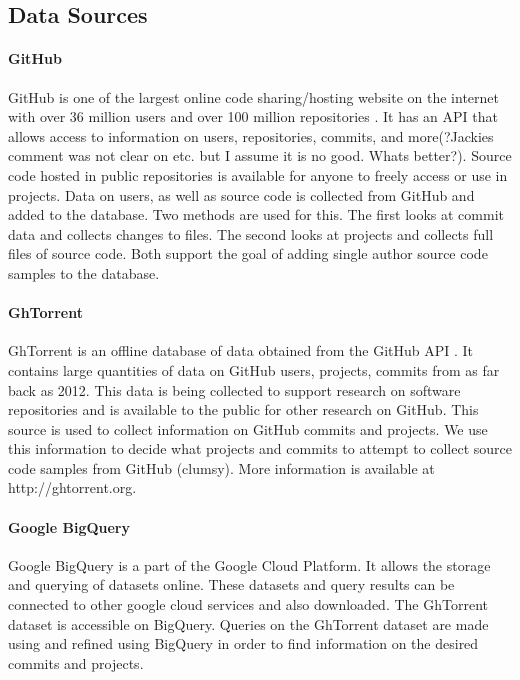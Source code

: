 \documentclass{article}
\begin{document}
\subsection{Data Sources}
\paragraph{GitHub}
GitHub is one of the largest online code sharing/hosting website on the internet with over 36 million users and over 100 million repositories \cite{WEBSITE:Git1}. It has an API that allows access to information on users, repositories, commits, and more(?Jackies comment was not clear on etc. but I assume it is no good. Whats better?). Source code hosted in public repositories is available for anyone to freely access or use in projects. Data on users, as well as source code is collected from GitHub and added to the database. Two methods are used for this. The first looks at commit data and collects changes to files. The second looks at projects and collects full files of source code. Both support the goal of adding single author source code samples to the database.

\paragraph{GhTorrent}
GhTorrent is an offline database of data obtained from the GitHub API \cite{Gousi13}. It contains large quantities of data on GitHub users, projects, commits from as far back as 2012. This data is being collected to support research on software repositories and is available to the public for other research on GitHub. This source is used to collect information on GitHub commits and projects. We use this information to decide what projects and commits to attempt to collect source code samples from GitHub (clumsy). More information is available at http://ghtorrent.org.

\paragraph{Google BigQuery}
Google BigQuery is a part of the Google Cloud Platform. It allows the storage and querying of datasets online. These datasets and query results can be connected to other google cloud services and also downloaded. The GhTorrent dataset is accessible on BigQuery. Queries on the GhTorrent dataset are made  using and refined using BigQuery in order to find information on the desired commits and projects.
\end{document}
